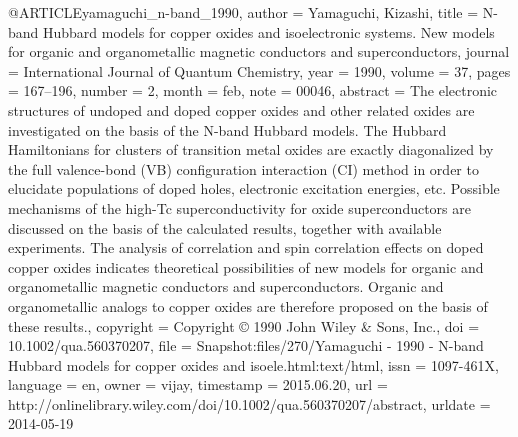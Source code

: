 @ARTICLE{yamaguchi_n-band_1990,
  author = {Yamaguchi, Kizashi},
  title = {N-band {Hubbard} models for copper oxides and isoelectronic systems.
	{New} models for organic and organometallic magnetic conductors and
	superconductors},
  journal = {International Journal of Quantum Chemistry},
  year = {1990},
  volume = {37},
  pages = {167--196},
  number = {2},
  month = feb,
  note = {00046},
  abstract = {The electronic structures of undoped and doped copper oxides and other
	related oxides are investigated on the basis of the N-band Hubbard
	models. The Hubbard Hamiltonians for clusters of transition metal
	oxides are exactly diagonalized by the full valence-bond (VB) configuration
	interaction (CI) method in order to elucidate populations of doped
	holes, electronic excitation energies, etc. Possible mechanisms of
	the high-Tc superconductivity for oxide superconductors are discussed
	on the basis of the calculated results, together with available experiments.
	The analysis of correlation and spin correlation effects on doped
	copper oxides indicates theoretical possibilities of new models for
	organic and organometallic magnetic conductors and superconductors.
	Organic and organometallic analogs to copper oxides are therefore
	proposed on the basis of these results.},
  copyright = {Copyright © 1990 John Wiley \& Sons, Inc.},
  doi = {10.1002/qua.560370207},
  file = {Snapshot:files/270/Yamaguchi - 1990 - N-band Hubbard models for copper oxides and isoele.html:text/html},
  issn = {1097-461X},
  language = {en},
  owner = {vijay},
  timestamp = {2015.06.20},
  url = {http://onlinelibrary.wiley.com/doi/10.1002/qua.560370207/abstract},
  urldate = {2014-05-19}
}

